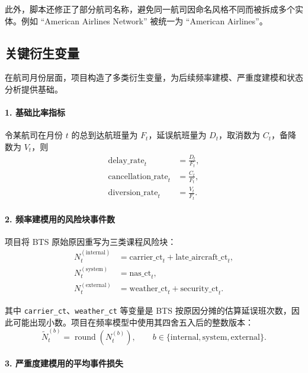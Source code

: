 此外，脚本还修正了部分航司名称，避免同一航司因命名风格不同而被拆成多个实体。例如 ``American Airlines Network'' 被统一为 ``American Airlines''。

\subsection{关键衍生变量}

在航司月份层面，项目构造了多类衍生变量，为后续频率建模、严重度建模和状态分析提供基础。

\paragraph{1. 基础比率指标}

令某航司在月份 $t$ 的总到达航班量为 $F_t$，延误航班量为 $D_t$，取消数为 $C_t$，备降数为 $V_t$，则
\begin{align}
\text{delay\_rate}_t &= \frac{D_t}{F_t}, \\
\text{cancellation\_rate}_t &= \frac{C_t}{F_t}, \\
\text{diversion\_rate}_t &= \frac{V_t}{F_t}.
\end{align}

\paragraph{2. 频率建模用的风险块事件数}

项目将 BTS 原始原因重写为三类课程风险块：
\begin{align}
N_t^{(\text{internal})} &= \text{carrier\_ct}_t + \text{late\_aircraft\_ct}_t, \\
N_t^{(\text{system})} &= \text{nas\_ct}_t, \\
N_t^{(\text{external})} &= \text{weather\_ct}_t + \text{security\_ct}_t.
\end{align}

其中 \texttt{carrier\_ct}、\texttt{weather\_ct} 等变量是 BTS 按原因分摊的估算延误班次数，因此可能出现小数。项目在频率模型中使用其四舍五入后的整数版本：
\begin{equation}
\tilde{N}_t^{(b)} = \operatorname{round}(N_t^{(b)}), \qquad b \in \{\text{internal}, \text{system}, \text{external}\}.
\end{equation}

\paragraph{3. 严重度建模用的平均事件损失}

